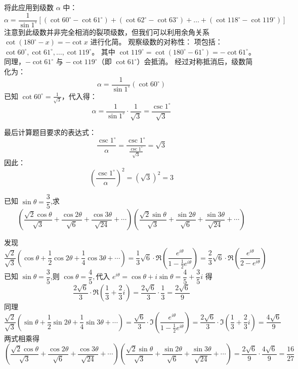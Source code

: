 \begin{questions}
\begin{solution}
将此应用到级数 $\alpha$ 中：
\[
\alpha = \frac{1}{\sin 1^\circ} [ (\cot 60^\circ - \cot 61^\circ) + (\cot 62^\circ - \cot 63^\circ) + \dots + (\cot 118^\circ - \cot 119^\circ) ]
\]
注意到此级数并非完全相消的裂项级数，但我们可以利用余角关系 $\cot(180^\circ - x) = -\cot x$ 进行化简。
观察级数的对称性：
项包括：$\cot 60^\circ, \cot 61^\circ, \dots, \cot 119^\circ$。
其中 $\cot 119^\circ = \cot(180^\circ - 61^\circ) = -\cot 61^\circ$。
同理，$-\cot 61^\circ$ 与 $-\cot 119^\circ$（即 $\cot 61^\circ$）会抵消。
经过对称抵消后，级数简化为：
\[
\alpha = \frac{1}{\sin 1^\circ} \left( \cot 60^\circ \right)
\]
已知 $\cot 60^\circ = \frac{1}{\sqrt{3}}$，代入得：
\[
\alpha = \frac{1}{\sin 1^\circ} \cdot \frac{1}{\sqrt{3}} = \frac{\csc 1^\circ}{\sqrt{3}}
\]

最后计算题目要求的表达式：
\[
\frac{\csc 1^\circ}{\alpha} = \frac{\csc 1^\circ}{\frac{\csc 1^\circ}{\sqrt{3}}} = \sqrt{3}
\]
因此：
\[
\left( \frac{\csc 1^\circ}{\alpha} \right)^2 = (\sqrt{3})^2 = 3
\]
\end{solution}

    \question 已知 $\sin\theta=\dfrac{3}{5}$,求
    \[
    \left( \frac{\sqrt{2}\cos\theta}{\sqrt{3}}+ \frac{\cos 2\theta}{\sqrt{6}}+ \frac{\cos 3\theta}{\sqrt{24}}+\cdots \right)
    \left( \frac{\sqrt{2}\sin\theta}{\sqrt{3}}+ \frac{\sin 2\theta}{\sqrt{6}}+ \frac{\sin 3\theta}{\sqrt{24}}+\cdots \right)
    \]
    \begin{solution}
        发现
        \[
        \frac{\sqrt{2}}{\sqrt{3}} \left( \cos\theta + \frac{1}{2}\cos 2\theta + \frac{1}{4}\cos 3\theta + \cdots \right)
        = \frac{1}{3} \sqrt{6} \cdot \Re \left( \frac{e^{i\theta}}{1 - \frac{1}{2} e^{i\theta}} \right)
        = \frac{2}{3} \sqrt{6} \cdot \Re \left( \frac{e^{i\theta}}{2 - e^{i\theta}} \right)        
        \]
        已知 \(\sin\theta = \dfrac{3}{5}\),则 \(\cos\theta = \dfrac{4}{5},\)代入 \(e^{i\theta} = \cos\theta + i\sin\theta = \dfrac{4}{5} + \dfrac{3}{5}i\) 得
        \[
        \frac{2\sqrt{6}}{3} \cdot \Re \left( \frac{1}{3} + \frac{2}{3}i \right)
        = \frac{2\sqrt{6}}{3} \cdot \frac{1}{3}
        = \frac{2\sqrt{6}}{9} 
        \]
        同理
        \[
        \frac{\sqrt{2}}{\sqrt{3}} \left( \sin\theta + \frac{1}{2}\sin 2\theta + \frac{1}{4}\sin 3\theta + \cdots \right) 
        = \frac{\sqrt{6}}{3}  \cdot \Im \left( \frac{e^{i\theta}}{1 - \frac{1}{2} e^{i\theta}} \right)
        = \frac{2\sqrt{6}}{3}  \cdot \Im \left( \frac{1}{3} + \frac{2}{3}i \right)
        = \frac{4\sqrt{6}}{9} 
        \]
        两式相乘得
        \[
        \left( \frac{\sqrt{2}\cos\theta}{\sqrt{3}}+ \frac{\cos 2\theta}{\sqrt{6}}+ \frac{\cos 3\theta}{\sqrt{24}}+\cdots \right)
        \left( \frac{\sqrt{2}\sin\theta}{\sqrt{3}}+ \frac{\sin 2\theta}{\sqrt{6}}+ \frac{\sin 3\theta}{\sqrt{24}}+\cdots \right)=\frac{2\sqrt{6}}{9}  \cdot \frac{4\sqrt{6}}{9} = \frac{16}{27}
        \]  
    \end{solution}


\end{questions}
